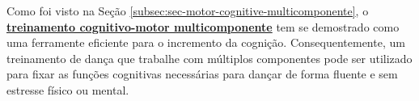 Como foi visto na Seção \ref{subsec:sec-motor-cognitive-multicomponente},
o \hyperref[subsec:sec-motor-cognitive-multicomponente]{\textbf{treinamento cognitivo-motor multicomponente}}
tem se demostrado como uma ferramente eficiente para o incremento da cognição.
Consequentemente, um treinamento de dança que trabalhe com múltiplos componentes
pode ser utilizado para fixar as funções cognitivas necessárias para dançar 
de forma fluente e sem estresse físico ou mental.





